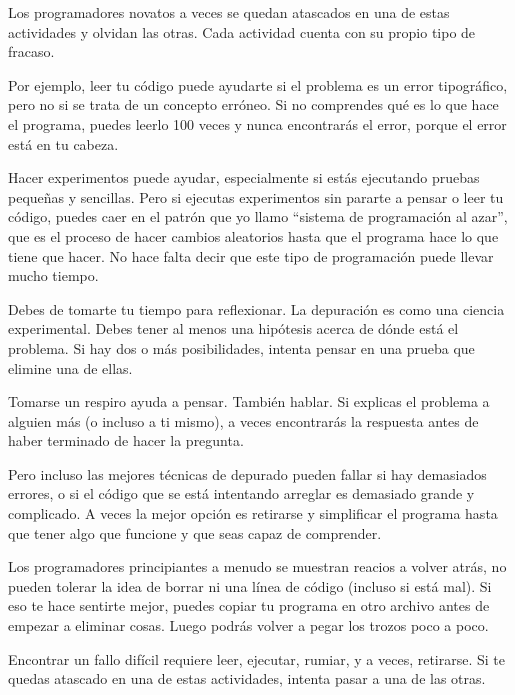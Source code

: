 Los programadores novatos a veces se quedan atascados en una de estas actividades
y olvidan las otras. Cada actividad cuenta con su propio tipo
de fracaso.


Por ejemplo, leer tu código puede ayudarte si el problema es un
error tipográfico, pero no si se trata de un concepto
erróneo. Si no comprendes qué es lo que hace el programa, puedes
leerlo 100 veces y nunca encontrarás el error, porque el error está en
tu cabeza.


Hacer experimentos puede ayudar, especialmente si estás ejecutando
pruebas pequeñas y sencillas. Pero si ejecutas experimentos sin pararte a pensar
o leer tu código, puedes caer en el patrón que yo llamo ``sistema de programación al azar'',
que es el proceso de hacer cambios aleatorios hasta que el programa
hace lo que tiene que hacer. No hace falta decir que este tipo de programación
puede llevar mucho tiempo.


Debes de tomarte tu tiempo para reflexionar. La depuración es como una
ciencia experimental. Debes tener al menos una hipótesis acerca
de dónde está el problema. Si hay dos o más posibilidades, intenta
pensar en una prueba que elimine una de ellas.

Tomarse un respiro ayuda a pensar. También hablar.
Si explicas el problema a alguien más (o incluso a ti mismo),
a veces encontrarás la respuesta antes de haber terminado de hacer la pregunta.

Pero incluso las mejores técnicas de depurado pueden fallar si hay demasiados
errores, o si el código que se está intentando arreglar es demasiado grande
y complicado. A veces la mejor opción es retirarse y simplificar el
programa hasta que tener algo que funcione y que seas
capaz de comprender.

Los programadores principiantes a menudo se muestran reacios a volver atrás,
no pueden tolerar la idea de borrar ni una línea de código (incluso si está mal).
Si eso te hace sentirte mejor, puedes copiar tu programa en otro archivo
antes de empezar a eliminar cosas. Luego podrás volver a pegar los
trozos poco a poco.

Encontrar un fallo difícil requiere leer, ejecutar, rumiar, y
a veces, retirarse. Si te quedas atascado en una de estas actividades,
intenta pasar a una de las otras.


